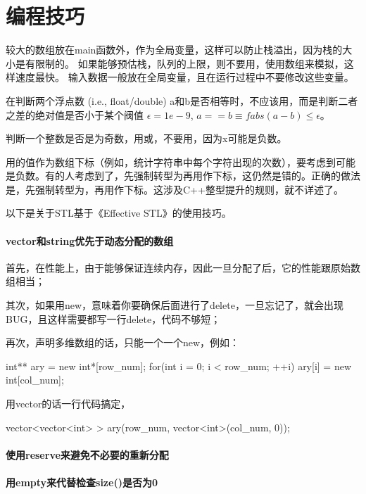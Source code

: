 \chapter{编程技巧}
较大的数组放在main函数外，作为全局变量，这样可以防止栈溢出，因为栈的大小是有限制的。
如果能够预估栈，队列的上限，则不要用，使用数组来模拟，这样速度最快。
输入数据一般放在全局变量，且在运行过程中不要修改这些变量。


在判断两个浮点数 (i.e.,
float/double)
a和b是否相等时，不应该用，而是判断二者之差的绝对值是否小于某个阀值
$\epsilon=1e-9$, $a==b\equiv fabs(a-b)\leq\epsilon$。

判断一个整数是否是为奇数，用或，不要用，因为x可能是负数。

用的值作为数组下标（例如，统计字符串中每个字符出现的次数），要考虑到可能是负数。有的人考虑到了，先强制转型为再用作下标，这仍然是错的。正确的做法是，先强制转型为，再用作下标。这涉及C++整型提升的规则，就不详述了。

以下是关于STL基于《Effective STL》的使用技巧。

\subsubsection{vector和string优先于动态分配的数组}
首先，在性能上，由于能够保证连续内存，因此一旦分配了后，它的性能跟原始数组相当；

其次，如果用new，意味着你要确保后面进行了delete，一旦忘记了，就会出现BUG，且这样需要都写一行delete，代码不够短；

再次，声明多维数组的话，只能一个一个new，例如：
\begin{Code}
	int** ary = new int*[row_num];
	for(int i = 0; i < row_num; ++i)
		ary[i] = new int[col_num];
\end{Code}

用vector的话一行代码搞定，
\begin{Code}
	vector<vector<int> > ary(row_num, vector<int>(col_num, 0));
\end{Code}
\subsubsection{使用reserve来避免不必要的重新分配}
\subsubsection{用empty来代替检查size()是否为0}
